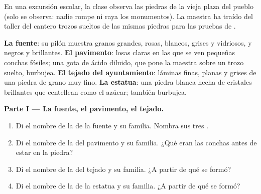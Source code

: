 \begin{problem}
\label{pb:g6:rocks-and-minerals:1}
En una excursión escolar, la clase observa las piedras de la vieja plaza
del pueblo (solo se observa: nadie rompe ni raya los monumentos). La
maestra ha traído del taller del cantero trozos sueltos de las mismas
piedras para las pruebas de .

\smallskip
\noindent\textbf{La fuente}: su pilón muestra granos grandes, rosas,
        blancos, grises y vidriosos, y negros y brillantes.
\textbf{El pavimento}: losas claras en las que se ven pequeñas conchas
        fósiles; una gota de ácido diluido, que pone la maestra sobre un
        trozo suelto, burbujea.
\textbf{El tejado del ayuntamiento}: láminas finas, planas y grises de una
        piedra de grano muy fino.
\textbf{La estatua}: una piedra blanca hecha de cristales brillantes que
        centellean como el azúcar; también burbujea.

\medskip
\noindent\textbf{Parte I --- La fuente, el pavimento, el tejado.}
\begin{enumerate}
  \item Di el nombre de la  de la fuente y su familia. Nombra sus tres
        .
  \item Di el nombre de la  del pavimento y su familia. ¿Qué eran las
        conchas antes de estar en la piedra?
  \item Di el nombre de la  del tejado y su familia. ¿A partir de qué
         se formó?
  \item Di el nombre de la  de la estatua y su familia. ¿A partir de
        qué  se formó?
\end{enumerate}


\end{problem}
